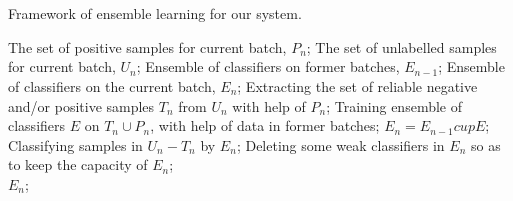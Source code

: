 \documentclass[]{article}
\title{}
\author{}
\begin{document}
	
	\maketitle
	
	\begin{abstract}
		
	\end{abstract}
	
	\section{}
	
	\begin{algorithm}[htbp]
		\caption{ Framework of ensemble learning for our system.}
		\label{alg:Framwork}
		\begin{algorithmic}[1]
			\Require
			The set of positive samples for current batch, $P_n$;
			The set of unlabelled samples for current batch, $U_n$;
			Ensemble of classifiers on former batches, $E_{n-1}$;
			\Ensure
			Ensemble of classifiers on the current batch, $E_n$;
			\State Extracting the set of reliable negative and/or positive samples $T_n$ from $U_n$ with help of $P_n$;
			\label{code:fram:extract}
			\State Training ensemble of classifiers $E$ on $T_n \cup P_n$, with help of data in former batches;
			\label{code:fram:trainbase}
			\State $E_n=E_{n-1}cup E$;
			\label{code:fram:add}
			\State Classifying samples in $U_n-T_n$ by $E_n$;
			\label{code:fram:classify}
			\State Deleting some weak classifiers in $E_n$ so as to keep the capacity of $E_n$;
			\label{code:fram:select} \\
			\Return $E_n$;
		\end{algorithmic}
	\end{algorithm}
	
\end{document}
